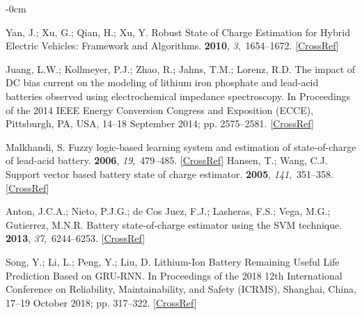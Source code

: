 \documentclass[energies,article,accept,pdftex,moreauthors]{Definitions/mdpi}
\begin{document}
\begin{adjustwidth}{-\extralength}{0cm}
\begin{thebibliography}{999}
    Yan, J.; Xu, G.; Qian, H.; Xu, Y.
    \newblock Robust State of Charge Estimation for Hybrid Electric Vehicles:
    Framework and Algorithms.
     {\bf 2010}, {\em 3},~1654--1672. [\href{http://dx.doi.org/10.3390/en3101654}{CrossRef}]
    
    {Juang}, L.W.; {Kollmeyer}, P.J.; {Zhao}, R.; {Jahns}, T.M.; {Lorenz}, R.D.
    \newblock The impact of DC bias current on the modeling of lithium iron
    phosphate and lead-acid batteries observed using electrochemical impedance
    spectroscopy.
    \newblock In Proceedings of the 2014 IEEE Energy Conversion Congress and
    Exposition (ECCE), Pittsburgh, PA, USA, 14--18 September
    2014; pp. 2575--2581. [\href{http://dx.doi.org/10.1109/ECCE.2014.6953745}{CrossRef}]
    
    Malkhandi, S.
    \newblock Fuzzy logic-based learning system and estimation of state-of-charge
    of lead-acid battery.
     {\bf 2006},
    {\em 19},~479--485. [\href{http://dx.doi.org/10.1016/j.engappai.2005.12.005}{CrossRef}]
    \newpage
    Hansen, T.; Wang, C.J.
    \newblock Support vector based battery state of charge estimator.
     {\bf 2005}, {\em 141},~351--358.
    [\href{http://dx.doi.org/10.1016/j.jpowsour.2004.09.020}{CrossRef}]
    
    Anton, J.C.A.; Nieto, P.J.G.; de Cos Juez, F.J.; Lasheras, F.S.; Vega, M.G.;
    Gutierrez, M.N.R.
    \newblock Battery state-of-charge estimator using the {SVM} technique.
     {\bf 2013}, {\em 37},~6244--6253. [\href{http://dx.doi.org/10.1016/j.apm.2013.01.024}{CrossRef}]
    
    Song, Y.; Li, L.; Peng, Y.; Liu, D.
    \newblock Lithium-{Ion} {Battery} {Remaining} {Useful} {Life} {Prediction}
    {Based} on {GRU}-{RNN}.
    \newblock In Proceedings of the 2018 12th {International} {Conference} on
    {Reliability}, {Maintainability}, and {Safety} ({ICRMS}), Shanghai, China, 17--19 October 2018; pp.
    317--322. [\href{http://dx.doi.org/10.1109/ICRMS.2018.00067}{CrossRef}]
    

\end{thebibliography}
\end{adjustwidth}
\end{document}
